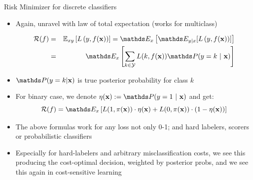 \documentclass[11pt,compress,t,notes=noshow, xcolor=table]{beamer}
\begin{document}
\begin{vbframe}{Risk Minimizer for discrete classifiers}

\begin{itemize}

\item Again, unravel with law of total expectation (works for multiclass)

\vspace*{-0.5cm}

\begin{eqnarray*}
  \riskf  & = & \Exy\left[\Lxy\right] = \E_x \left[ \E_{y|x} [ \Lxy ] \right] \\
          & = & \E_x \left[\sum_{k \in \Yspace} L(k, \fx) \P(y = k~|~ \xv)\right] 
\end{eqnarray*}

\item $\P(y = k| \xv)$ is true posterior probability for class $k$

\item For binary case, we denote $\eta(\xv) := \P(y = 1 ~|~ \xv)$ and get: 
$$
\riskf = \E_x \left[L(1, \pix) \cdot \eta(\xv) + L(0, \pix) \cdot (1 - \eta(\xv)) \right]
$$

\item The above formulas work for any loss not only 0-1; and hard labelers, scorers or probabilistic classifiers

\item Especially for hard-labelers and arbitrary misclassification costs, we see this producing the cost-optimal decision, weighted by posterior probs, and we see this again in cost-sensitive learning





\end{itemize}

\end{vbframe}
\end{document}
